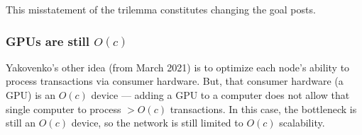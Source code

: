 This misstatement of the trilemma constitutes changing the goal posts.

\subsubsection{GPUs are still $O(c)$}

Yakovenko's other idea (from March 2021) is to optimize each node's ability to process transactions via consumer hardware.
But, that consumer hardware (a GPU) is an $O(c)$ device --- adding a GPU to a computer does not allow that single computer to process $> O(c)$ transactions.
In this case, the bottleneck is still an $O(c)$ device, so the network is still limited to $O(c)$ scalability.






